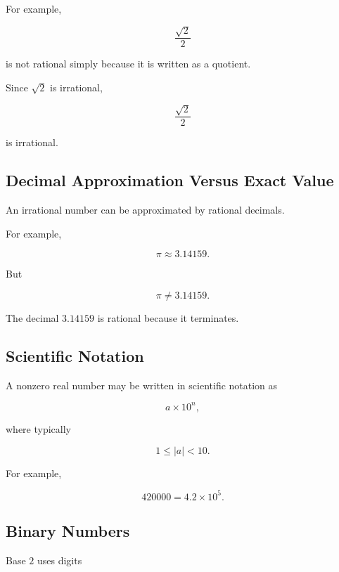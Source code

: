 For example,

\[
\boxed{
\frac{\sqrt2}{2}
}
\]

is not rational simply because it is written as a quotient.

Since \(\sqrt2\) is irrational,

\[
\boxed{
\frac{\sqrt2}{2}
}
\]

is irrational.

\subsection{Decimal Approximation Versus Exact Value}
\label{subsec:decimal-approximation-exact-value}

An irrational number can be approximated by rational decimals.

For example,

\[
\boxed{
\pi
\approx
3.14159.
}
\]

But

\[
\boxed{
\pi
\neq
3.14159.
}
\]

The decimal \(3.14159\) is rational because it terminates.

\subsection{Scientific Notation}
\label{subsec:scientific-notation-reference}

A nonzero real number may be written in scientific notation as

\[
\boxed{
a\times10^n,
}
\]

where typically

\[
\boxed{
1\leq|a|<10.
}
\]

For example,

\[
\boxed{
420000
=
4.2\times10^5.
}
\]

\subsection{Binary Numbers}
\label{subsec:binary-numbers-reference}

Base \(2\) uses digits

